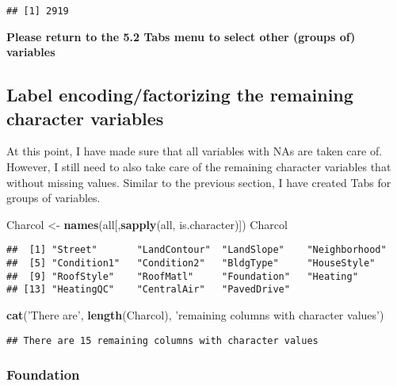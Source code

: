 \documentclass[]{article}
\newenvironment{Shaded}{\begin{snugshade}}{\end{snugshade}}
\newcommand{\KeywordTok}[1]{\textcolor[rgb]{0.13,0.29,0.53}{\textbf{#1}}}
\newcommand{\StringTok}[1]{\textcolor[rgb]{0.31,0.60,0.02}{#1}}
\newcommand{\NormalTok}[1]{#1}
\begin{document}
\begin{verbatim}
## [1] 2919
\end{verbatim}

\textbf{Please return to the 5.2 Tabs menu to select other (groups of)
variables}

\subsection{Label encoding/factorizing the remaining character
variables}\label{label-encodingfactorizing-the-remaining-character-variables}

At this point, I have made sure that all variables with NAs are taken
care of. However, I still need to also take care of the remaining
character variables that without missing values. Similar to the previous
section, I have created Tabs for groups of variables.

\begin{Shaded}
\begin{Highlighting}[]
\NormalTok{Charcol <-}\StringTok{ }\KeywordTok{names}\NormalTok{(all[,}\KeywordTok{sapply}\NormalTok{(all, is.character)])}
\NormalTok{Charcol}
\end{Highlighting}
\end{Shaded}

\begin{verbatim}
##  [1] "Street"       "LandContour"  "LandSlope"    "Neighborhood"
##  [5] "Condition1"   "Condition2"   "BldgType"     "HouseStyle"  
##  [9] "RoofStyle"    "RoofMatl"     "Foundation"   "Heating"     
## [13] "HeatingQC"    "CentralAir"   "PavedDrive"
\end{verbatim}

\begin{Shaded}
\begin{Highlighting}[]
\KeywordTok{cat}\NormalTok{(}\StringTok{'There are'}\NormalTok{, }\KeywordTok{length}\NormalTok{(Charcol), }\StringTok{'remaining columns with character values'}\NormalTok{)}
\end{Highlighting}
\end{Shaded}

\begin{verbatim}
## There are 15 remaining columns with character values
\end{verbatim}

\subsubsection{Foundation}\label{foundation}
\end{document}
